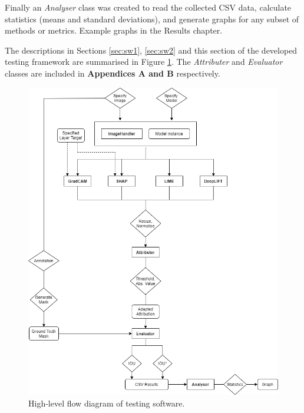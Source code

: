 \documentclass[main]{subfiles}
\begin{document}
Finally an \textit{Analyser} class was created to read the collected CSV data, calculate statistics (means and standard deviations), and generate graphs for any subset of methods or metrics. Example graphs in the Results chapter.

The descriptions in Sections \ref{sec:sw1}, \ref{sec:sw2} and this section of the developed testing framework are summarised in Figure \ref{flow_image}. The \textit{Attributer} and \textit{Evaluator} classes are included in \textbf{Appendices A and B} respectively.


\begin{figure}[htbp]
\centering
\includegraphics[scale=0.6]{program_flow.png}
\caption{High-level flow diagram of testing software.}
\label{flow_image}
\end{figure}
\end{document}

